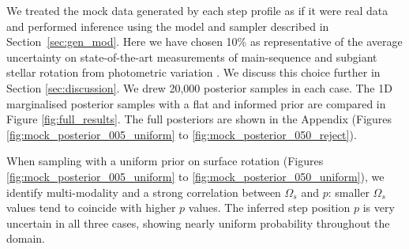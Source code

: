 We treated the mock data generated by each step profile as if it were real data and performed inference using the model and sampler described in Section~\ref{sec:gen_mod}.  Here we have chosen 10\% as representative of the average uncertainty on state-of-the-art measurements of main-sequence and subgiant stellar rotation from photometric variation \citep{santos_surface_2021}. We discuss this choice further in Section \ref{sec:discussion}. We drew 20,000 posterior samples in each case. The 1D marginalised posterior samples with a flat and informed prior are compared in Figure \ref{fig:full_results}. The full posteriors are shown in the Appendix (Figures \ref{fig:mock_posterior_005_uniform} to \ref{fig:mock_posterior_050_reject}). 

When sampling with a uniform prior on surface rotation (Figures \ref{fig:mock_posterior_005_uniform} to  \ref{fig:mock_posterior_050_uniform}), we identify multi-modality and a strong correlation between $\Omega_s$ and $p$: smaller $\Omega_s$ values tend to coincide with higher $p$ values. The inferred step position $p$ is very uncertain in all three cases, showing nearly uniform probability throughout the domain.

